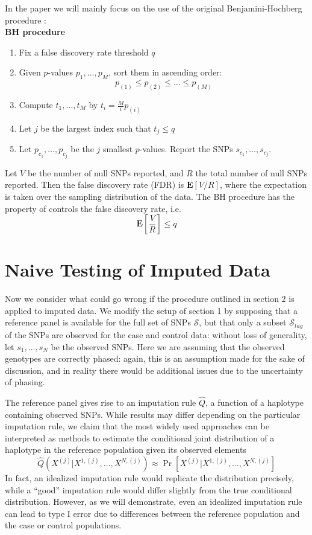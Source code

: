 \documentclass[12pt]{article}
\begin{document}
In the paper we will mainly focus on the use of the original
Benjamini-Hochberg procedure \cite{Benjamini1995}:
\[\]
\noindent\textbf{BH procedure}
\begin{enumerate}
\item Fix a false discovery rate threshold $q$
\item Given $p$-values $p_1,\hdots,p_M$, sort them in ascending order:
\[
p_{(1)} \leq p_{(2)} \leq \hdots \leq p_{(M)}
\]
\item 
Compute $t_1,\hdots,t_M$
by $t_i = \frac{M}{i}p_{(i)}$
\item Let $j$ be the largest index such that $t_j \leq q$
\item Let $p_{c_1},\hdots,p_{c_j}$ be the $j$ smallest $p$-values.
Report the SNPs $s_{c_1},\hdots,s_{c_j}$.
\end{enumerate}
Let $V$ be the number of null SNPs reported, and $R$ the total
number of null SNPs reported.
Then the false discovery rate (FDR) is $\textbf{E}[V/R]$,
where the expectation is taken over the sampling distribution of the data.
The BH procedure has the property of controls the false discovery
rate, i.e.
\[
\textbf{E}\left[\frac{V}{R}\right] \leq q
\]

\section{Naive Testing of Imputed Data}

Now we consider what could go wrong if the procedure
outlined in section 2 is applied to imputed data.
We modify the setup of section 1 by supposing that a reference panel
is available for the full set of SNPs $\mathcal{S}$, but that
only a
subset $\mathcal{S}_{tag}$ of the SNPs are observed for the case and
control data:
without loss of generality, let $s_1,\hdots,s_N$ be the observed SNPs.
Here we are assuming that the observed genotypes are correctly phased:
again, this is an assumption made for the sake of discussion,
and in reality there would be additional issues due to the uncertainty
of phasing.

The reference panel gives rise to an imputation rule $\hat{Q}$,
a function of a haplotype containing observed SNPs.
While results may differ depending on the particular imputation rule,
we claim that the most widely used approaches \cite{Marchini2010}
can be interpreted as methods to estimate the conditional joint
distribution of a haplotype in the reference population
given its observed elements
\[
\hat{Q}(X^{(j)}|X^{1,(j)},\hdots,X^{N,(j)}) \approx \Pr[X^{(j)}|X^{1,(j)},\hdots,X^{N,(j)}]
\]
In fact, an idealized imputation rule would replicate the distribution
precisely, while a ``good'' imputation rule would differ slightly
from the true conditional distribution.
However, as we will demonstrate, even an idealized imputation
rule can lead to type I error due to differences between
the reference population and the case or control populations.
\end{document}
